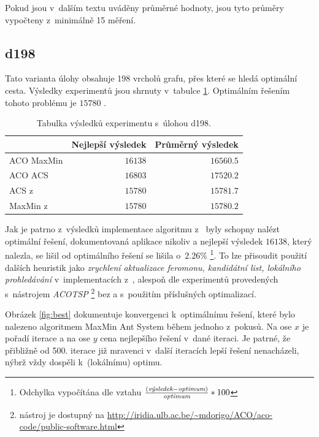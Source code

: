 \documentclass[a4paper, 12pt]{article}
\begin{document}
Pokud jsou v~dalším textu uváděny průměrné hodnoty, jsou tyto průměry vypočteny z~minimálně 15 měření.

\subsection{d198}
Tato varianta úlohy obsahuje 198 vrcholů grafu, přes které se hledá optimální cesta. 
Výsledky experimentů jsou shrnuty v~tabulce \ref{tabd198}. Optimálním řešením tohoto problému je $15 780$ \cite{aco:acs}.
\begin{table}[tb]
\begin{center}
  \begin{tabular}{ | l | r | r |}
   \hline
    & \textbf{Nejlepší výsledek} & \textbf{Průměrný výsledek} \\ \hline \hline
    ACO MaxMin & $16138$ & $16560.5$ \\ \hline
    ACO ACS & $16803$ & $17520.2$ \\ \hline
    ACS z~\cite{aco:acs} & $15 780$ & $15 781.7$ \\ \hline
    MaxMin z~\cite{aco:maxmintsp} & $15 780$ & $15 780.2$\\ \hline
   \end{tabular}
   \caption{Tabulka výsledků experimentu s~úlohou d198.}
   \label{tabd198}
\end{center}
\end{table}
Jak je patrno z~výsledků implementace algoritmu z~\cite{aco:maxmintsp,aco:acs} byly schopny nalézt optimální řešení, dokumentovaná aplikace nikoliv a nejlepší
výsledek $16138$, který nalezla, se lišil
od optimálního řešení se lišila o~$2.26\%$ \footnote{Odchylka vypočítána dle vztahu $\frac{(\emph{výsledek}-\emph{optimum})}{\emph{optimum}}*100$}. To lze
přisoudit použití dalších heuristik jako \emph{zrychlení aktualizace feromonu, kandidátní list, lokálního prohledávání}
v~implementacích z~\cite{aco:maxmintsp,aco:acs}, alespoň dle experimentů provedených s~nástrojem \emph{ACOTSP} \footnote{nástroj je dostupný na
\url{http://iridia.ulb.ac.be/~mdorigo/ACO/aco-code/public-software.html}} bez a s~použitím příslušných optimalizací.

Obrázek \ref{fig:best} dokumentuje konvergenci k~optimálnímu řešení, které bylo nalezeno algoritmem MaxMin Ant System během jednoho z~pokusů.
Na ose $x$ je pořadí iterace a na ose $y$ cena nejlepšího řešení v~dané iteraci. Je patrné, že přibližně od 500. iterace již mravenci v~další iteracích lepší řešení
nenacházeli, nýbrž vždy dospěli k~(lokálnímu) optimu.
\end{document}
